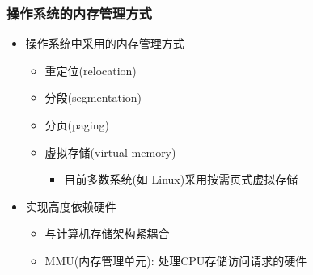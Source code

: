 \begin{frame}[plain,t]
    
    \frametitle{操作系统的内存管理方式}
	\begin{itemize}
	    \item 操作系统中采用的内存管理方式
	    \begin{itemize}
	        \item 重定位(relocation)
	        \item 分段(segmentation)
	        \item 分页(paging)
	        \item 虚拟存储(virtual memory)
		    \begin{itemize}
		        \item 目前多数系统(如 Linux)采用按需页式虚拟存储
		    \end{itemize}
	    \end{itemize}
	    \item 实现高度依赖硬件
	    \begin{itemize}
	        \item 与计算机存储架构紧耦合
	        \item MMU(内存管理单元): 处理CPU存储访问请求的硬件
	    \end{itemize}
	\end{itemize}
\end{frame}

